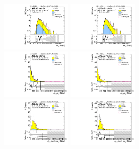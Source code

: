 \begin{figure}[htbp!]
\begin{center}
\includegraphics[width=0.31\textwidth,angle=-90]{figures/boosted/Prereweight/Moriond_FourTag_Control_mHH_l_1.pdf}
\includegraphics[width=0.31\textwidth,angle=-90]{figures/boosted/Control/b77_FourTag_Control_mHH_l_1.pdf}\\
\includegraphics[width=0.31\textwidth,angle=-90]{figures/boosted/Prereweight/Moriond_FourTag_Control_leadHCand_Pt_m.pdf}
\includegraphics[width=0.31\textwidth,angle=-90]{figures/boosted/Control/b77_FourTag_Control_leadHCand_Pt_m.pdf}\\
\includegraphics[width=0.31\textwidth,angle=-90]{figures/boosted/Prereweight/Moriond_FourTag_Control_leadHCand_trk0_Pt.pdf}
\includegraphics[width=0.31\textwidth,angle=-90]{figures/boosted/Control/b77_FourTag_Control_leadHCand_trk0_Pt.pdf}\\

\end{center}
\end{figure}
